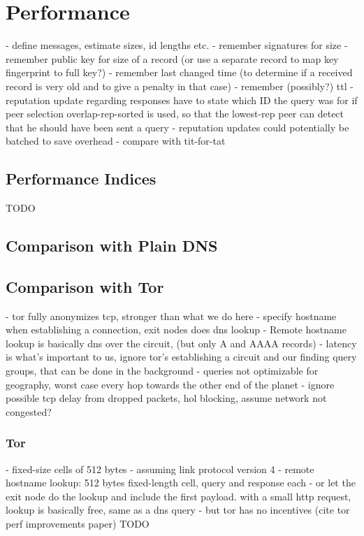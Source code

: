 \chapter{Performance}
\label{chap:performance}
- define messages, estimate sizes, id lengths etc.
    - remember signatures for size
    - remember public key for size of a record (or use a separate record to map
      key fingerprint to full key?)
    - remember last changed time (to determine if a received record is very old
      and to give a penalty in that case)
    - remember (possibly?) ttl
    - reputation update regarding responses have to state which ID the query was
      for if peer selection overlap-rep-sorted is used, so that the lowest-rep
      peer can detect that he should have been sent a query
- reputation updates could potentially be batched to save overhead
- compare with tit-for-tat
\section{Performance Indices}
TODO
\section{Comparison with Plain DNS}
\section{Comparison with Tor}
- tor fully anonymizes tcp, stronger than what we do here
    - specify hostname when establishing a connection, exit nodes does dns
      lookup
    - Remote hostname lookup is basically dns over the circuit, (but only A and
      AAAA records)
- latency is what's important to us, ignore tor's establishing a circuit and our
  finding query groups, that can be done in the background
- queries not optimizable for geography, worst case every hop towards the other
  end of the planet
- ignore possible tcp delay from dropped packets, hol blocking, assume network
  not congested?
\subsection{Tor}
- fixed-size cells of 512 bytes
- assuming link protocol version 4
- remote hostname lookup: 512 bytes fixed-length cell, query and response each
- or let the exit node do the lookup and include the first payload. with a small
  http request, lookup is basically free, same as a dns query
- but tor has no incentives (cite tor perf improvements paper)
TODO
